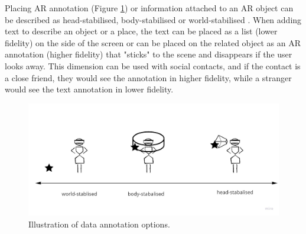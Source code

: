 Placing AR annotation (Figure \ref{fig:continuum:data-annotation}) or information attached to an AR object can be described as head-stabilised, body-stabilised or world-stabilised \cite{Billinghurst1998}. When adding text to describe an object or a place, the text can be placed as a list (lower fidelity) on the side of the screen or can be placed on the related object as an AR annotation (higher fidelity) that "sticks" to the scene and disappears if the user looks away. This dimension can be used with social contacts, and if the contact is a close friend, they would see the annotation in higher fidelity, while a stranger would see the text annotation in lower fidelity. 


\begin{figure}[h]
    \centering
    \includegraphics[width=0.8\linewidth]{images/30-continuum/continuum-annotation.jpg}
    \caption{Illustration of data annotation options.}
    \label{fig:continuum:data-annotation}
\end{figure}




